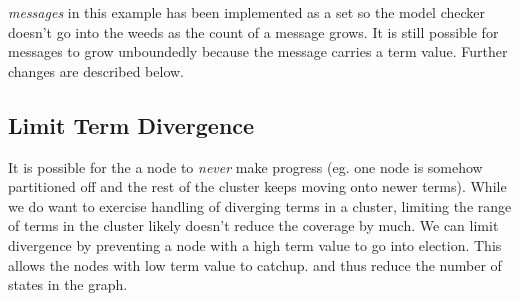 \documentclass{report}
\begin{document}
\textit{messages} in this example has been implemented as a set so the model 
checker doesn't go into the weeds as the count of a message grows. It is still 
possible for messages to grow unboundedly because the message carries a term
value. Further changes are described below.

\subsection{Limit Term Divergence} 

It is possible for the a node to \textit{never} make progress (eg. one node is
somehow partitioned off and the rest of the cluster keeps moving onto newer
terms). While we do want to exercise handling of diverging terms in a cluster,
limiting the range of terms in the cluster likely doesn't reduce the coverage by
much.  We can limit divergence by preventing a node with a high term value to go
into election. This allows the nodes with low term value to catchup. and thus
reduce the number of states in the graph.\newline
\end{document}
